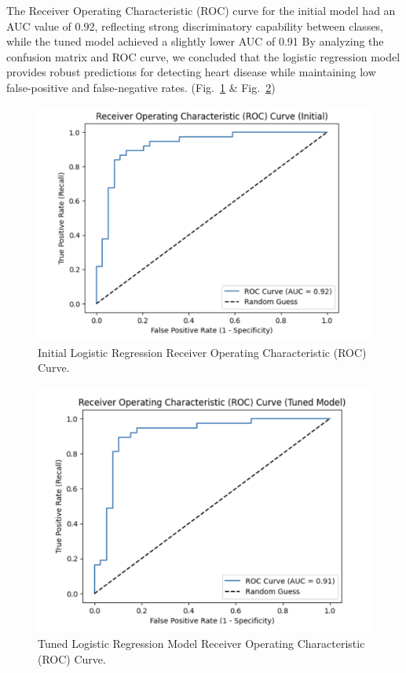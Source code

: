 The Receiver Operating Characteristic (ROC) curve for the initial model had an AUC value of 0.92, reflecting strong discriminatory capability between classes, while the tuned model achieved a slightly lower AUC of 0.91
By analyzing the confusion matrix and ROC curve, we concluded that the logistic regression model provides robust predictions for detecting heart disease while maintaining low false-positive and false-negative rates. (Fig.~\ref{Initial Logistic Regression Receiver Operating Characteristic (ROC) Curve} \& Fig.~\ref{Tuned Logistic Regression Model Receiver Operating Characteristic (ROC) Curve})

\begin{figure}[htbp]
    \centerline{\includegraphics[scale=0.2]{img/Receiver Operating Characteristic Curve Inital.png}}
    \caption{Initial Logistic Regression Receiver Operating Characteristic (ROC) Curve.}\label{Initial Logistic Regression Receiver Operating Characteristic (ROC) Curve}
\end{figure}

\begin{figure}[htbp]
    \centerline{\includegraphics[scale=0.2]{img/Receiver Operating Characteristic Curve Tuned Model.png}}
    \caption{Tuned Logistic Regression Model Receiver Operating Characteristic (ROC) Curve.}\label{Tuned Logistic Regression Model Receiver Operating Characteristic (ROC) Curve}
\end{figure}

